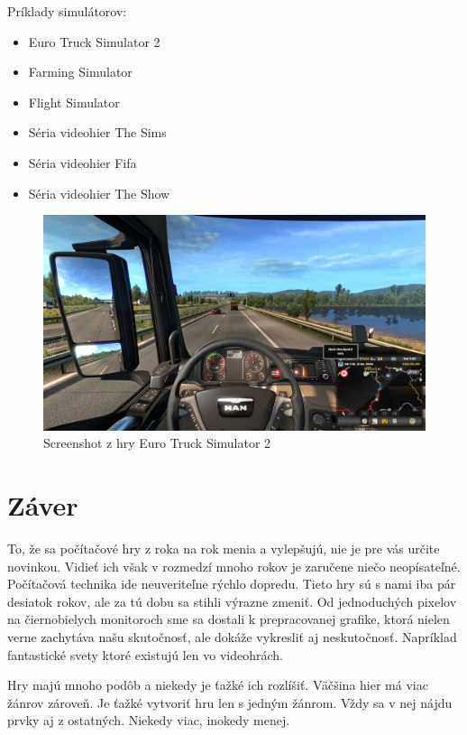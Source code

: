 \documentclass[10pt,oneside,slovak,a4paper]{article}
\begin{document}
Príklady simulátorov:
\begin{itemize}
\item Euro Truck Simulator 2
\item Farming Simulator
\item Flight Simulator
\item Séria videohier The Sims
\item Séria videohier Fifa
\item Séria videohier The Show
\end{itemize}

\begin{figure}[tbh]
\centering
\includegraphics[scale=0.15]{ets.jpg}
\caption{Screenshot z hry Euro Truck Simulator 2}
\label{f:ets2}
\end{figure}



\section{Záver} \label{zaver} %

To, že sa počítačové hry z roka na rok menia a vylepšujú, nie je pre vás určite novinkou. Vidieť ich však v rozmedzí mnoho rokov je zaručene niečo neopísateľné. Počítačová technika ide neuveriteľne rýchlo dopredu. Tieto hry sú s nami iba pár desiatok rokov, ale za tú dobu sa stihli výrazne zmeniť. Od jednoduchých pixelov na čiernobielych monitoroch sme sa dostali k prepracovanej grafike, ktorá nielen verne zachytáva našu skutočnosť, ale dokáže vykresliť aj neskutočnosť. Napríklad fantastické svety ktoré existujú len vo videohrách.


Hry majú mnoho podôb a niekedy je ťažké ich rozlíšiť. Väčšina hier má viac žánrov zároveň. Je ťažké vytvoriť hru len s jedným žánrom. Vždy sa v nej nájdu prvky aj z ostatných. Niekedy viac, inokedy menej.



%






\end{document}
